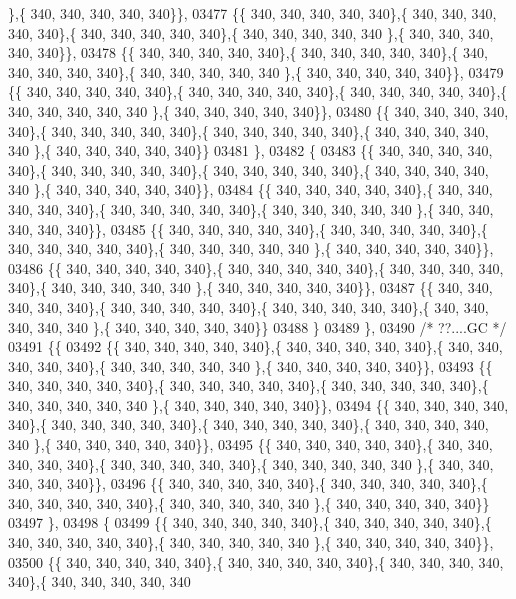 \begin{DoxyCode}
      \},\{ 340, 340, 340, 340, 340\}\},
03477 \{\{ 340, 340, 340, 340, 340\},\{ 340, 340, 340, 340, 340\},\{ 340, 340, 340, 340, 340\},\{ 340, 340, 340, 340, 340
      \},\{ 340, 340, 340, 340, 340\}\},
03478 \{\{ 340, 340, 340, 340, 340\},\{ 340, 340, 340, 340, 340\},\{ 340, 340, 340, 340, 340\},\{ 340, 340, 340, 340, 340
      \},\{ 340, 340, 340, 340, 340\}\},
03479 \{\{ 340, 340, 340, 340, 340\},\{ 340, 340, 340, 340, 340\},\{ 340, 340, 340, 340, 340\},\{ 340, 340, 340, 340, 340
      \},\{ 340, 340, 340, 340, 340\}\},
03480 \{\{ 340, 340, 340, 340, 340\},\{ 340, 340, 340, 340, 340\},\{ 340, 340, 340, 340, 340\},\{ 340, 340, 340, 340, 340
      \},\{ 340, 340, 340, 340, 340\}\}
03481 \},
03482 \{
03483 \{\{ 340, 340, 340, 340, 340\},\{ 340, 340, 340, 340, 340\},\{ 340, 340, 340, 340, 340\},\{ 340, 340, 340, 340, 340
      \},\{ 340, 340, 340, 340, 340\}\},
03484 \{\{ 340, 340, 340, 340, 340\},\{ 340, 340, 340, 340, 340\},\{ 340, 340, 340, 340, 340\},\{ 340, 340, 340, 340, 340
      \},\{ 340, 340, 340, 340, 340\}\},
03485 \{\{ 340, 340, 340, 340, 340\},\{ 340, 340, 340, 340, 340\},\{ 340, 340, 340, 340, 340\},\{ 340, 340, 340, 340, 340
      \},\{ 340, 340, 340, 340, 340\}\},
03486 \{\{ 340, 340, 340, 340, 340\},\{ 340, 340, 340, 340, 340\},\{ 340, 340, 340, 340, 340\},\{ 340, 340, 340, 340, 340
      \},\{ 340, 340, 340, 340, 340\}\},
03487 \{\{ 340, 340, 340, 340, 340\},\{ 340, 340, 340, 340, 340\},\{ 340, 340, 340, 340, 340\},\{ 340, 340, 340, 340, 340
      \},\{ 340, 340, 340, 340, 340\}\}
03488 \}
03489 \},
03490 \textcolor{comment}{/* ??....GC */}
03491 \{\{
03492 \{\{ 340, 340, 340, 340, 340\},\{ 340, 340, 340, 340, 340\},\{ 340, 340, 340, 340, 340\},\{ 340, 340, 340, 340, 340
      \},\{ 340, 340, 340, 340, 340\}\},
03493 \{\{ 340, 340, 340, 340, 340\},\{ 340, 340, 340, 340, 340\},\{ 340, 340, 340, 340, 340\},\{ 340, 340, 340, 340, 340
      \},\{ 340, 340, 340, 340, 340\}\},
03494 \{\{ 340, 340, 340, 340, 340\},\{ 340, 340, 340, 340, 340\},\{ 340, 340, 340, 340, 340\},\{ 340, 340, 340, 340, 340
      \},\{ 340, 340, 340, 340, 340\}\},
03495 \{\{ 340, 340, 340, 340, 340\},\{ 340, 340, 340, 340, 340\},\{ 340, 340, 340, 340, 340\},\{ 340, 340, 340, 340, 340
      \},\{ 340, 340, 340, 340, 340\}\},
03496 \{\{ 340, 340, 340, 340, 340\},\{ 340, 340, 340, 340, 340\},\{ 340, 340, 340, 340, 340\},\{ 340, 340, 340, 340, 340
      \},\{ 340, 340, 340, 340, 340\}\}
03497 \},
03498 \{
03499 \{\{ 340, 340, 340, 340, 340\},\{ 340, 340, 340, 340, 340\},\{ 340, 340, 340, 340, 340\},\{ 340, 340, 340, 340, 340
      \},\{ 340, 340, 340, 340, 340\}\},
03500 \{\{ 340, 340, 340, 340, 340\},\{ 340, 340, 340, 340, 340\},\{ 340, 340, 340, 340, 340\},\{ 340, 340, 340, 340, 340

\end{DoxyCode}
